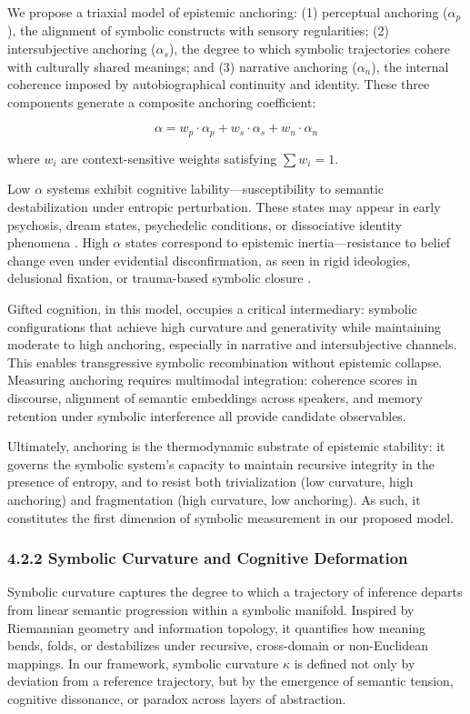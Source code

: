 We propose a triaxial model of epistemic anchoring: (1) perceptual anchoring ($\alpha_p$), the alignment of symbolic constructs with sensory regularities; (2) intersubjective anchoring ($\alpha_s$), the degree to which symbolic trajectories cohere with culturally shared meanings; and (3) narrative anchoring ($\alpha_n$), the internal coherence imposed by autobiographical continuity and identity. These three components generate a composite anchoring coefficient:

\[
\alpha = w_p \cdot \alpha_p + w_s \cdot \alpha_s + w_n \cdot \alpha_n
\]

where $w_i$ are context-sensitive weights satisfying $\sum w_i = 1$.

Low $\alpha$ systems exhibit cognitive lability—susceptibility to semantic destabilization under entropic perturbation. These states may appear in early psychosis, dream states, psychedelic conditions, or dissociative identity phenomena \cite{carhart2014entropic, varela1996neurophenomenology}. High $\alpha$ states correspond to epistemic inertia—resistance to belief change even under evidential disconfirmation, as seen in rigid ideologies, delusional fixation, or trauma-based symbolic closure \cite{bateson1979mind}.

Gifted cognition, in this model, occupies a critical intermediary: symbolic configurations that achieve high curvature and generativity while maintaining moderate to high anchoring, especially in narrative and intersubjective channels. This enables transgressive symbolic recombination without epistemic collapse. Measuring anchoring requires multimodal integration: coherence scores in discourse, alignment of semantic embeddings across speakers, and memory retention under symbolic interference all provide candidate observables.

Ultimately, anchoring is the thermodynamic substrate of epistemic stability: it governs the symbolic system’s capacity to maintain recursive integrity in the presence of entropy, and to resist both trivialization (low curvature, high anchoring) and fragmentation (high curvature, low anchoring). As such, it constitutes the first dimension of symbolic measurement in our proposed model.

\subsubsection*{4.2.2 Symbolic Curvature and Cognitive Deformation}

Symbolic curvature captures the degree to which a trajectory of inference departs from linear semantic progression within a symbolic manifold. Inspired by Riemannian geometry and information topology, it quantifies how meaning bends, folds, or destabilizes under recursive, cross-domain or non-Euclidean mappings. In our framework, symbolic curvature $\kappa$ is defined not only by deviation from a reference trajectory, but by the emergence of semantic tension, cognitive dissonance, or paradox across layers of abstraction.

